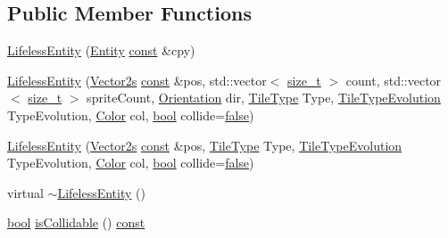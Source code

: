 \subsection*{Public Member Functions}
\begin{DoxyCompactItemize}
\item 
\hyperlink{classarcade_1_1_lifeless_entity_a9d5e0ddbaefd8ed239c81f4d8d135eeb}{Lifeless\-Entity} (\hyperlink{classarcade_1_1_entity}{Entity} \hyperlink{term__entry_8h_a57bd63ce7f9a353488880e3de6692d5a}{const} \&cpy)
\item 
\hyperlink{classarcade_1_1_lifeless_entity_afb485f3dd85ae97241f299bda3455581}{Lifeless\-Entity} (\hyperlink{namespacearcade_a8e527f7400fbff9c38dc31e0a3dd06a1}{Vector2s} \hyperlink{term__entry_8h_a57bd63ce7f9a353488880e3de6692d5a}{const} \&pos, std\-::vector$<$ \hyperlink{nc__alloc_8h_a7b60c5629e55e8ec87a4547dd4abced4}{size\-\_\-t} $>$ count, std\-::vector$<$ \hyperlink{nc__alloc_8h_a7b60c5629e55e8ec87a4547dd4abced4}{size\-\_\-t} $>$ sprite\-Count, \hyperlink{namespacearcade_a370755573a2c68e25c59bedd4bce1342}{Orientation} dir, \hyperlink{namespacearcade_a61ba576694ea309cdf2b4b66902408ca}{Tile\-Type} Type, \hyperlink{namespacearcade_a2e0a64a64203f78c9efb84a1475a8cf4}{Tile\-Type\-Evolution} Type\-Evolution, \hyperlink{unionarcade_1_1_color}{Color} col, \hyperlink{term__entry_8h_a002004ba5d663f149f6c38064926abac}{bool} collide=\hyperlink{_snake_8cpp_ae6c865df784842196d411c1466b01686}{false})
\item 
\hyperlink{classarcade_1_1_lifeless_entity_a41ed1cd12cb2f45599a64cffdcf35d6a}{Lifeless\-Entity} (\hyperlink{namespacearcade_a8e527f7400fbff9c38dc31e0a3dd06a1}{Vector2s} \hyperlink{term__entry_8h_a57bd63ce7f9a353488880e3de6692d5a}{const} \&pos, \hyperlink{namespacearcade_a61ba576694ea309cdf2b4b66902408ca}{Tile\-Type} Type, \hyperlink{namespacearcade_a2e0a64a64203f78c9efb84a1475a8cf4}{Tile\-Type\-Evolution} Type\-Evolution, \hyperlink{unionarcade_1_1_color}{Color} col, \hyperlink{term__entry_8h_a002004ba5d663f149f6c38064926abac}{bool} collide=\hyperlink{_snake_8cpp_ae6c865df784842196d411c1466b01686}{false})
\item 
virtual \hyperlink{classarcade_1_1_lifeless_entity_aa91eb9b954a2073154d91ccb3b3b29c9}{$\sim$\-Lifeless\-Entity} ()
\item 
\hyperlink{term__entry_8h_a002004ba5d663f149f6c38064926abac}{bool} \hyperlink{classarcade_1_1_lifeless_entity_af7ced7061400dbd68cc0eb2fec8b3a93}{is\-Collidable} () \hyperlink{term__entry_8h_a57bd63ce7f9a353488880e3de6692d5a}{const} 
\end{DoxyCompactItemize}
